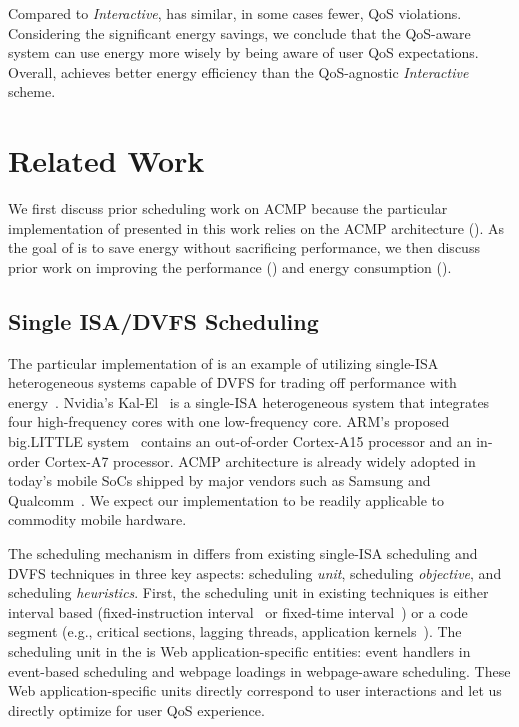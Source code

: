Compared to \textit{Interactive}, \ebs has similar, in some cases fewer, QoS violations. Considering the significant energy savings, we conclude that the QoS-aware \ebs system can use energy more wisely by being aware of user QoS expectations. Overall, \ebs achieves better energy efficiency than the QoS-agnostic \textit{Interactive} scheme.

\section{Related Work}
\label{sec:runtime:related}

We first discuss prior scheduling work on ACMP because the particular implementation of \webrt presented in this work relies on the ACMP architecture (). As the goal of \webrt is to save energy without sacrificing performance, we then discuss prior work on improving the performance () and energy consumption ().

\subsection{Single ISA/DVFS Scheduling}
\label{sec:runtime:related:sched}

The particular implementation of \webrt is an example of utilizing single-ISA heterogeneous systems capable of DVFS for trading off performance with energy~\cite{single-ISA}. Nvidia's Kal-El~\cite{Tegra3} is a single-ISA heterogeneous system that integrates four high-frequency cores with one low-frequency core. ARM's proposed big.LITTLE system~\cite{big.little} contains an out-of-order Cortex-A15 processor and an in-order Cortex-A7 processor. ACMP architecture is already widely adopted in today's mobile SoCs shipped by major vendors such as Samsung and Qualcomm~\cite{exynos5biglittle}. We expect our \webrt implementation to be readily applicable to commodity mobile hardware.

The scheduling mechanism in \webrt differs from existing single-ISA scheduling and DVFS techniques in three key aspects: scheduling \textit{unit}, scheduling \textit{objective}, and scheduling \textit{heuristics}. First, the scheduling unit in existing techniques is either interval based (fixed-instruction interval~\cite{single-ISA,compositecores,tracephase,tm,DVFSPred} or fixed-time interval~\cite{DCS,MIPJ,PIE,ondemand,unfairsched}) or a code segment (e.g., critical sections, lagging threads, application kernels~\cite{acs,bis,uba,YinYang}). The scheduling unit in the \webrt is Web application-specific entities: event handlers in event-based scheduling and webpage loadings in webpage-aware scheduling. These Web application-specific units directly correspond to user interactions and let us directly optimize for user QoS experience.

